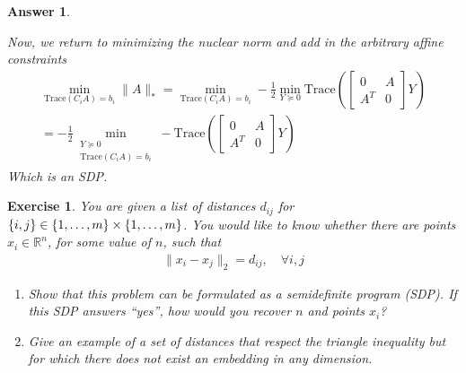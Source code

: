 \documentclass[12pt]{article}
\theoremstyle{colon}
\newtheorem{exercise}{Exercise}
\newtheorem*{answer}{Answer}
\begin{document}
\begin{answer}
\begin{enumerate}[label=\arabic*)]
      Now, we return to minimizing the nuclear norm and add in the arbitrary affine constraints
      \begin{gather*}
        \min_{\text{Trace}(C_i A) = b_i} \lVert A \rVert_* = \min_{\text{Trace}(C_i A) = b_i} -\frac{1}{2} \min_{Y \succeq 0} \text{Trace} \left( \begin{bmatrix} 0 & A \\ A^T & 0 \end{bmatrix} Y \right) \\
        = -\frac{1}{2} \min_{\substack{Y \succeq 0 \\ \text{Trace}(C_i A) = b_i}} -\text{Trace} \left( \begin{bmatrix} 0 & A \\ A^T & 0 \end{bmatrix} Y \right)
      \end{gather*}
      Which is an SDP.
  \end{enumerate}
\end{answer}

\clearpage

\begin{exercise}
  You are given a list of distances $d_{ij}$ for $\{i,j\} \in \{1, \mathellipsis, m\} \times \{1, \mathellipsis, m\}$. You would like to know whether there are points $x_i \in \mathbb{R}^n$, for some value of $n$, such that
  \begin{gather*}
    \lVert x_i - x_j \rVert_2 = d_{ij}, \quad \forall i,j
  \end{gather*}
  \begin{enumerate}[label=\arabic*)]
    \item Show that this problem can be formulated as a semidefinite program (SDP). If this SDP answers ``yes'', how would you recover $n$ and points $x_i$?
    \item Give an example of a set of distances that respect the triangle inequality but for which there does not exist an embedding in any dimension.
  \end{enumerate}
\end{exercise}
\end{document}
